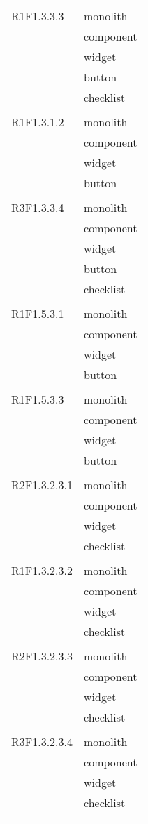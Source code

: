 \begin{center}
\begin{longtable}{|p{7cm}|p{7cm}|}
		R1F1.3.3.3 & monolith \\ & component \\ & widget \\ & button \\ & checklist \\ & \\ \hline
		R1F1.3.1.2 & monolith \\ & component \\ & widget \\ & button \\ & \\ \hline
		R3F1.3.3.4 & monolith \\ & component \\ & widget \\ & button \\ & checklist \\ & \\ \hline
		R1F1.5.3.1 & monolith \\ & component \\ & widget \\ & button \\ & \\ \hline
		R1F1.5.3.3 & monolith \\ & component \\ & widget \\ & button \\ & \\ \hline
		R2F1.3.2.3.1 & monolith \\ & component \\ & widget \\ & checklist \\ & \\ \hline
		R1F1.3.2.3.2 & monolith \\ & component \\ & widget \\ & checklist \\ & \\ \hline
		R2F1.3.2.3.3 & monolith \\ & component \\ & widget \\ & checklist \\ & \\ \hline
		R3F1.3.2.3.4 & monolith \\ & component \\ & widget \\ & checklist \\ & \\ \hline

\end{longtable}
\end{center}
